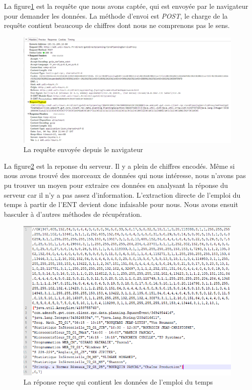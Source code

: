\documentclass[twoside]{EPURapport}
\begin{document}
La figure\ref{fig:ent_requestheader} est la requête que nous avons captée, qui est envoyée par le navigateur pour demander les données. La méthode d'envoi est \textit{POST}, le charge de la requête contient beaucoup de chiffres dont nous ne comprenons pas le sens.
\begin{figure}[!htbp]
	\centering
		\includegraphics[scale=0.6]{img/ent_requestheader2.png}
	\caption{La requête envoyée depuis le navigateur}
	\label{fig:ent_requestheader} 
\end{figure}
\bigskip

La figure\ref{fig:ent_response} est la reponse du serveur. Il y a plein de chiffres encodés. Même si nous avons trouvé des morceaux de données qui nous intéresse, nous n'avons pas pu trouver un moyen pour extraire ces données en analysant la réponse du serveur car il n'y a pas assez d'information. L'extraction directe de l'emploi du temps à partir de l'ENT devient donc infaisable pour nous. Nous avons ensuit basculer à d'autres méthodes de récupération.
\begin{figure}[!htbp]
	\centering
		\includegraphics[scale=0.7]{img/ent_response.png}
	\caption{La réponse reçue qui contient les données de l'emploi du temps}
	\label{fig:ent_response} 
\end{figure}
\bigskip
\end{document}
